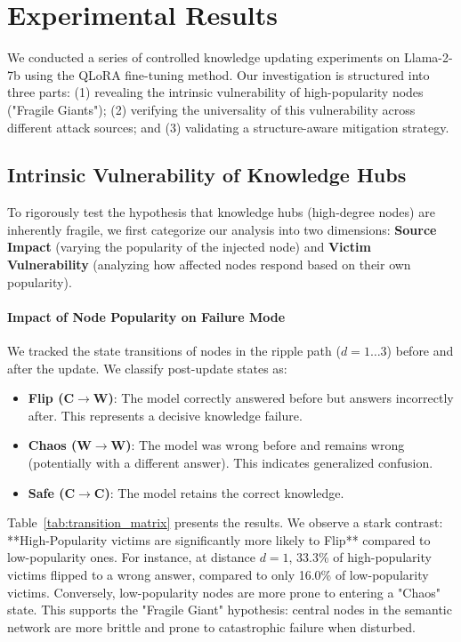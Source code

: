 \section{Experimental Results}
\label{sec:results}

We conducted a series of controlled knowledge updating experiments on Llama-2-7b using the QLoRA fine-tuning method. Our investigation is structured into three parts: (1) revealing the intrinsic vulnerability of high-popularity nodes ("Fragile Giants"); (2) verifying the universality of this vulnerability across different attack sources; and (3) validating a structure-aware mitigation strategy.

\subsection{Intrinsic Vulnerability of Knowledge Hubs}

To rigorously test the hypothesis that knowledge hubs (high-degree nodes) are inherently fragile, we first categorize our analysis into two dimensions: \textbf{Source Impact} (varying the popularity of the injected node) and \textbf{Victim Vulnerability} (analyzing how affected nodes respond based on their own popularity).

\paragraph{Impact of Node Popularity on Failure Mode}
We tracked the state transitions of nodes in the ripple path ($d=1\dots3$) before and after the update. We classify post-update states as:
\begin{itemize}
    \item \textbf{Flip (C$\to$W)}: The model correctly answered before but answers incorrectly after. This represents a decisive knowledge failure.
    \item \textbf{Chaos (W$\to$W)}: The model was wrong before and remains wrong (potentially with a different answer). This indicates generalized confusion.
    \item \textbf{Safe (C$\to$C)}: The model retains the correct knowledge.
\end{itemize}

Table~\ref{tab:transition_matrix} presents the results. We observe a stark contrast: **High-Popularity victims are significantly more likely to Flip** compared to low-popularity ones. For instance, at distance $d=1$, 33.3\% of high-popularity victims flipped to a wrong answer, compared to only 16.0\% of low-popularity victims. Conversely, low-popularity nodes are more prone to entering a "Chaos" state. This supports the "Fragile Giant" hypothesis: central nodes in the semantic network are more brittle and prone to catastrophic failure when disturbed.


